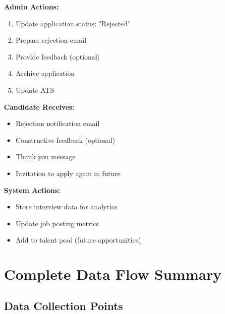 \documentclass[12pt,a4paper]{article}
\begin{document}
\begin{tcolorbox}[colback=dangerred!5,colframe=dangerred,title=\textbf{No Hire Decision Process}]

\textbf{Admin Actions:}
\begin{enumerate}
    \item Update application status: "Rejected"
    \item Prepare rejection email
    \item Provide feedback (optional)
    \item Archive application
    \item Update ATS
\end{enumerate}

\textbf{Candidate Receives:}
\begin{itemize}
    \item Rejection notification email
    \item Constructive feedback (optional)
    \item Thank you message
    \item Invitation to apply again in future
\end{itemize}

\textbf{System Actions:}
\begin{itemize}
    \item Store interview data for analytics
    \item Update job posting metrics
    \item Add to talent pool (future opportunities)
\end{itemize}

\end{tcolorbox}

\newpage

\section{Complete Data Flow Summary}

\subsection{Data Collection Points}
\end{document}
